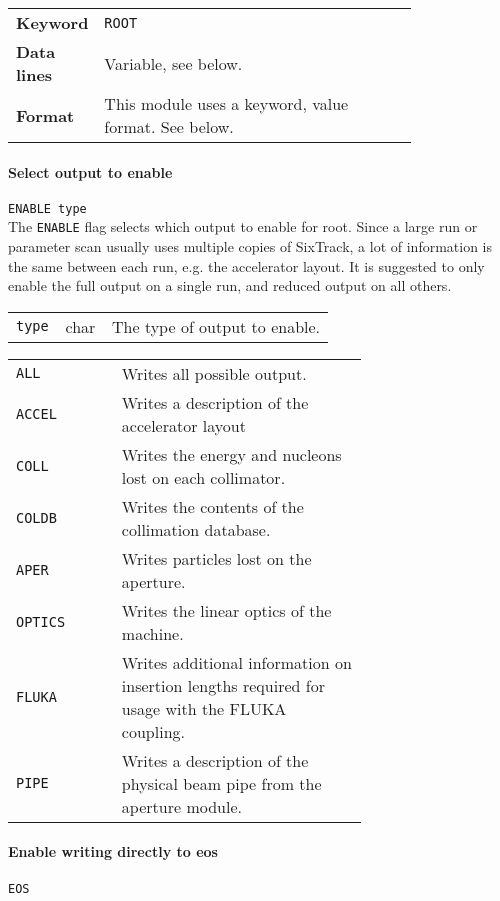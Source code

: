 \bigskip
\begin{tabular}{@{}lp{0.8\linewidth}}
    \textbf{Keyword}    & \texttt{ROOT}\index{ROOT} \\
    \textbf{Data lines} & Variable, see below. \\
    \textbf{Format}     & This module uses a keyword, value format. See below.
\end{tabular}

\paragraph{Select output to enable} \texttt{ENABLE type}\\

The \texttt{ENABLE} flag selects which output to enable for root.
Since a large run or parameter scan usually uses multiple copies of SixTrack, a lot of information is the same between each run, e.g. the accelerator layout.
It is suggested to only enable the full output on a single run, and reduced output on all others.


\bigskip
\begin{tabular}{@{}llp{0.7\linewidth}}
    \texttt{type} & char    & The type of output to enable.
\end{tabular}

\begin{tabular}{@{}lp{0.7\linewidth}}
    \texttt{ALL}    & Writes all possible output. \\
    \texttt{ACCEL}  & Writes a description of the accelerator layout \\
    \texttt{COLL}   & Writes the energy and nucleons lost on each collimator. \\
    \texttt{COLDB}  & Writes the contents of the collimation database. \\
    \texttt{APER}   & Writes particles lost on the aperture. \\
    \texttt{OPTICS} & Writes the linear optics of the machine. \\
    \texttt{FLUKA}  & Writes additional information on insertion lengths required for usage with the FLUKA coupling. \\
    \texttt{PIPE}   & Writes a description of the physical beam pipe from the aperture module.
\end{tabular}


\bigskip
\paragraph{Enable writing directly to eos} \texttt{EOS}\\

